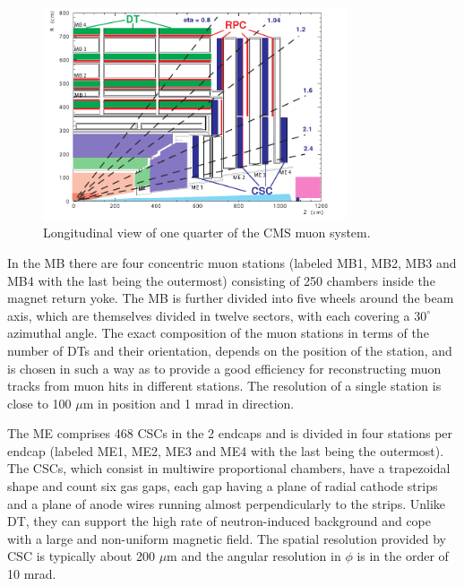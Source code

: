 \begin{figure}[h!]
\begin{center}
\includegraphics[width=0.8\textwidth]{figures/CMS/Muon/Muon.png}
\caption{Longitudinal view of one quarter of the CMS muon system.}
\label{fig:CMS_Muon}
\end{center}
\end{figure}

In the MB there are four concentric muon stations (labeled MB1, MB2, MB3 and MB4 with the last being the outermost) consisting of 250 chambers inside the magnet return yoke. The MB is further divided into five wheels around the beam axis, which are themselves divided in twelve sectors, with each covering a $30^{\circ}$ azimuthal angle. The exact composition of the muon stations in terms of the number of DTs and their orientation, depends on the position of the station, and is chosen in such a way as to provide a good efficiency for reconstructing muon tracks from muon hits in different stations. The resolution of a single station is close to 100 $\mu$m in position and 1 mrad in direction.

The ME comprises 468 CSCs in the 2 endcaps and is divided in four stations per endcap (labeled ME1, ME2, ME3 and ME4 with the last being the outermost). The CSCs, which consist in multiwire proportional chambers, have a trapezoidal shape and count six gas gaps, each gap having a plane of radial cathode strips and a plane of anode wires running almost perpendicularly to the strips. Unlike DT, they can support the high rate of neutron-induced background and cope with a large and non-uniform magnetic field. The spatial resolution provided by CSC is typically about 200 $\mu$m and the angular resolution in $\phi$ is in the order of 10 mrad.

